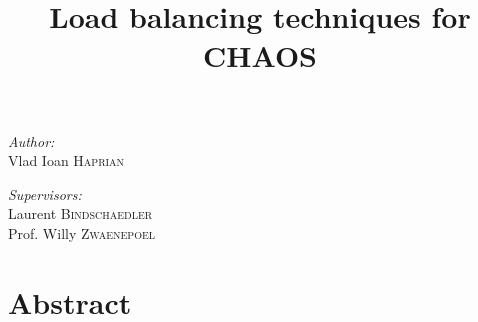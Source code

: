 \documentclass[nocopyrightspace,11pt,authoryear,preprint]{article}
\begin{document}
\title{Load balancing techniques for CHAOS}

\maketitle
\begin{minipage}{0.4\textwidth}
\begin{flushleft} \large
\emph{Author:}\\
Vlad Ioan \textsc{Haprian}\\
\end{flushleft}
\end{minipage}%
\begin{minipage}{0.4\textwidth}
\begin{flushleft} \large
\emph{Supervisors:}\\
Laurent \textsc{Bindschaedler}\\
Prof. Willy \textsc{Zwaenepoel}
\end{flushleft}
\end{minipage}

\section{Abstract}

\end{document}

